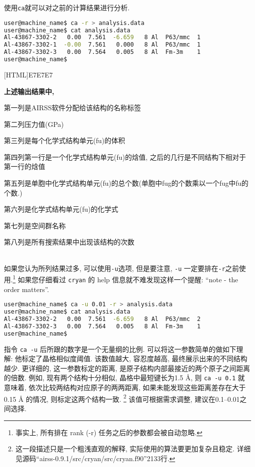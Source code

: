 \documentclass[a4paper, 10pt]{article}
\begin{document}
使用\verb|ca|就可以对之前的计算结果进行分析.
\begin{lstlisting}[language={bash}]
user@machine_name$ ca -r > analysis.data
user@machine_name$ cat analysis.data
Al-43867-3302-2   0.00  7.561  -6.659   8 Al  P63/mmc  1
Al-43867-3302-1  -0.00  7.561   0.000   8 Al  P63/mmc  1
Al-43867-3302-3   0.00  7.564   0.005   8 Al  Fm-3m    1
user@machine_name$
\end{lstlisting}

\noindent{}[HTML]{E7E7E7}{\parbox{\textwidth}{%
\noindent \textbf{上述输出结果中,}
\begin{maineu}
  \item 第一列是AIRSS软件分配给该结构的名称标签
  \item 第二列压力值(GPa)
  \item 第三列是每个化学式结构单元(fu)的体积
  \item 第四列第一行是一个化学式结构单元(fu)的焓值, 之后的几行是不同结构下相对于第一行的焓值
  \item 第五列是单胞中化学式结构单元(fu)的总个数(单胞中fug的个数乘以一个fug中fu的个数.)
  \item 第六列是化学式结构单元(fu)的化学式
  \item 第七列是空间群名称
  \item 第八列是所有搜索结果中出现该结构的次数
\end{maineu}}}\\

如果您认为所列结果过多, 可以使用\verb|-u|选项, 但是要注意, \verb|-u| 一定要排在\verb|-r|之前使用.\footnote{事实上, 所有排在 rank (-r) 任务之后的参数都会被自动忽略.} 如果您仔细看过 \verb|cryan| 的 help 信息就不难发现这样一个提醒: ``note - the order matters''.
\begin{lstlisting}[language={bash}]
user@machine_name$ ca -u 0.01 -r > analysis.data
user@machine_name$ cat analysis.data
Al-43867-3302-2   0.00  7.561  -6.659   8 Al  P63/mmc  2
Al-43867-3302-3   0.00  7.564   0.005   8 Al  Fm-3m    1
user@machine_name$
\end{lstlisting}

指令 \verb|ca -u| 后所跟的数字是一个无量纲的比例. 可以将这一参数简单的做如下理解:  他标定了晶格相似度阈值. 该数值越大, 容忍度越高, 最终展示出来的不同结构越少. 更详细的, 这一参数标定的距离, 是原子结构内部最接近的两个原子之间距离的倍数. 例如, 现有两个结构十分相似, 晶格中最短键长为1.5 \r{A}, 则 \verb|ca -u 0.1| 就意味着, 依次比较两结构对应原子的两两距离, 如果未能发现这些距离差存在大于0.15 \r{A} 的情况, 则标定这两个结构一致. \footnote{这一段描述只是一个粗浅直观的解释, 实际使用的算法要更加复杂且稳定. 详细见源码``airss-0.9.1/src/cryan/src/cryan.f90''2133行.} 该值可根据需求调整, 建议在0.1--0.01之间选择.
\end{document}
